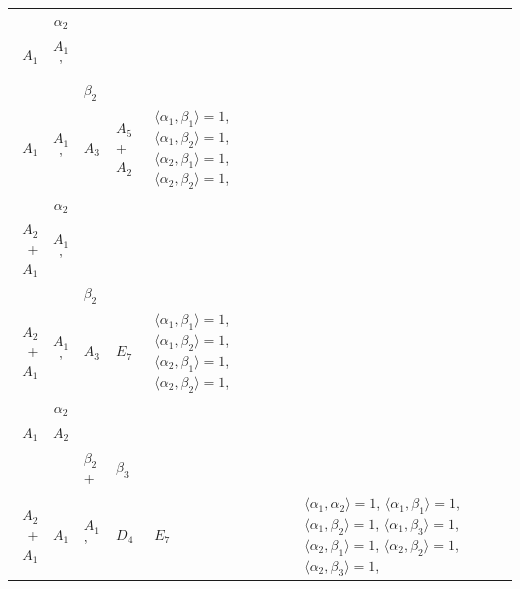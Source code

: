 \documentclass[12pt]{report}
\begin{document}
\begin{appendix}
{\begin{longtable}{rcl p{1cm}p{1cm}p{3cm} }
\\
\begin{tabular}{cc}$\alpha_1$+ & $\alpha_2$\\\tiny{ $A_1$ } & \tiny{ $A_1$' }\end{tabular} &\begin{tabular}{c} = \\~ \end{tabular} & \begin{tabular}{cc}$\beta_1$+ & $\beta_2$\\\tiny{ $A_1$ } & \tiny{ $A_1$' }\end{tabular} & $A_3$ & $A_5$+$A_2$ &  $\langle\alpha_1, \beta_1\rangle=1$, $\langle\alpha_1, \beta_2\rangle=1$, $\langle\alpha_2, \beta_1\rangle=1$, $\langle\alpha_2, \beta_2\rangle=1$, 
\\
\begin{tabular}{cc}$\alpha_1$+ & $\alpha_2$\\\tiny{ $A_2$+$A_1$ } & \tiny{ $A_1$' }\end{tabular} &\begin{tabular}{c} = \\~ \end{tabular} & \begin{tabular}{cc}$\beta_1$+ & $\beta_2$\\\tiny{ $A_2$+$A_1$ } & \tiny{ $A_1$' }\end{tabular} & $A_3$ & $E_7$ &  $\langle\alpha_1, \beta_1\rangle=1$, $\langle\alpha_1, \beta_2\rangle=1$, $\langle\alpha_2, \beta_1\rangle=1$, $\langle\alpha_2, \beta_2\rangle=1$, 
\\
\begin{tabular}{cc}$\alpha_1$+ & $\alpha_2$\\\tiny{ $A_1$ } & \tiny{ $A_2$ }\end{tabular} &\begin{tabular}{c} = \\~ \end{tabular} & \begin{tabular}{ccc}$\beta_1$+ & $\beta_2$+ & $\beta_3$\\\tiny{ $A_2$+$A_1$ } & \tiny{ $A_1$ } & \tiny{ $A_1$' }\end{tabular} & $D_4$ & $E_7$ & $\langle\alpha_1, \alpha_2\rangle=1$,  $\langle\alpha_1, \beta_1\rangle=1$, $\langle\alpha_1, \beta_2\rangle=1$, $\langle\alpha_1, \beta_3\rangle=1$, $\langle\alpha_2, \beta_1\rangle=1$, $\langle\alpha_2, \beta_2\rangle=1$, $\langle\alpha_2, \beta_3\rangle=1$, 
\\

\end{longtable}}
\end{appendix}
\end{document}
